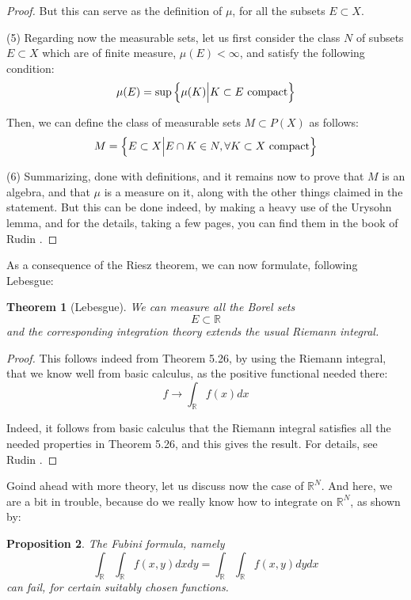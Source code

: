 \documentclass[12pt]{amsbook}
\newtheorem{theorem}{Theorem}[chapter]
\newtheorem{proposition}[theorem]{Proposition}
\begin{document}
\begin{proof}
But this can serve as the definition of $\mu$, for all the subsets $E\subset X$.

\medskip

(5) Regarding now the measurable sets, let us first consider the class $N$ of subsets $E\subset X$ which are of finite measure, $\mu(E)<\infty$, and satisfy the following condition:
$$\mu(E)=\sup\left\{\mu(K)\Big| K\subset E\ {\rm compact}\right\}$$

Then, we can define the class of measurable sets $M\subset P(X)$ as follows:
$$M=\left\{E\subset X\Big|E\cap K\in N,\forall K\subset X\ {\rm compact}\right\}$$

(6) Summarizing, done with definitions, and it remains now to prove that $M$ is an algebra, and that $\mu$ is a measure on it, along with the other things claimed in the statement. But this can be done indeed, by making a heavy use of the Urysohn lemma, and for the details, taking a few pages, you can find them in the book of Rudin \cite{rud}.
\end{proof}

As a consequence of the Riesz theorem, we can now formulate, following Lebesgue:

\begin{theorem}[Lebesgue]
We can measure all the Borel sets 
$$E\subset\mathbb R$$
and the corresponding integration theory extends the usual Riemann integral.
\end{theorem}

\begin{proof}
This follows indeed from Theorem 5.26, by using the Riemann integral, that we know well from basic calculus, as the positive functional needed there:
$$f\to\int_\mathbb Rf(x)dx$$

Indeed, it follows from basic calculus that the Riemann integral satisfies all the needed properties in Theorem 5.26, and this gives the result. For details, see Rudin \cite{rud}.
\end{proof}

Goind ahead with more theory, let us discuss now the case of $\mathbb R^N$. And here, we are a bit in trouble, because do we really know how to integrate on $\mathbb R^N$, as shown by:

\begin{proposition}
The Fubini formula, namely 
$$\int_\mathbb R\int_\mathbb Rf(x,y)dxdy=\int_\mathbb R\int_\mathbb Rf(x,y)dydx$$
can fail, for certain suitably chosen functions.
\end{proposition}
\end{document}
